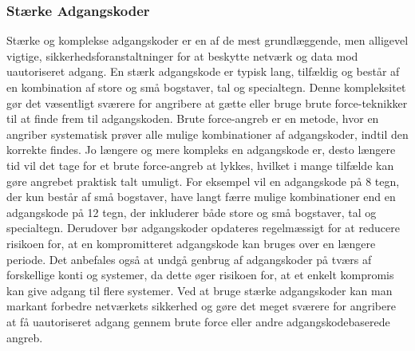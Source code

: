 \subsubsection{Stærke Adgangskoder}
Stærke og komplekse adgangskoder er en af de mest grundlæggende, men alligevel vigtige, sikkerhedsforanstaltninger for at beskytte netværk og data mod uautoriseret adgang. En stærk adgangskode er typisk lang, tilfældig og består af en kombination af store og små bogstaver, tal og specialtegn. Denne kompleksitet gør det væsentligt sværere for angribere at gætte eller bruge brute force-teknikker til at finde frem til adgangskoden.
\newline\newline\noindent
Brute force-angreb er en metode, hvor en angriber systematisk prøver alle mulige kombinationer af adgangskoder, indtil den korrekte findes. Jo længere og mere kompleks en adgangskode er, desto længere tid vil det tage for et brute force-angreb at lykkes, hvilket i mange tilfælde kan gøre angrebet praktisk talt umuligt. For eksempel vil en adgangskode på 8 tegn, der kun består af små bogstaver, have langt færre mulige kombinationer end en adgangskode på 12 tegn, der inkluderer både store og små bogstaver, tal og specialtegn.
\newline\newline\noindent
Derudover bør adgangskoder opdateres regelmæssigt for at reducere risikoen for, at en kompromitteret adgangskode kan bruges over en længere periode. Det anbefales også at undgå genbrug af adgangskoder på tværs af forskellige konti og systemer, da dette øger risikoen for, at et enkelt kompromis kan give adgang til flere systemer.
\newline\newline\noindent
Ved at bruge stærke adgangskoder kan man markant forbedre netværkets sikkerhed og gøre det meget sværere for angribere at få uautoriseret adgang gennem brute force eller andre adgangskodebaserede angreb.


